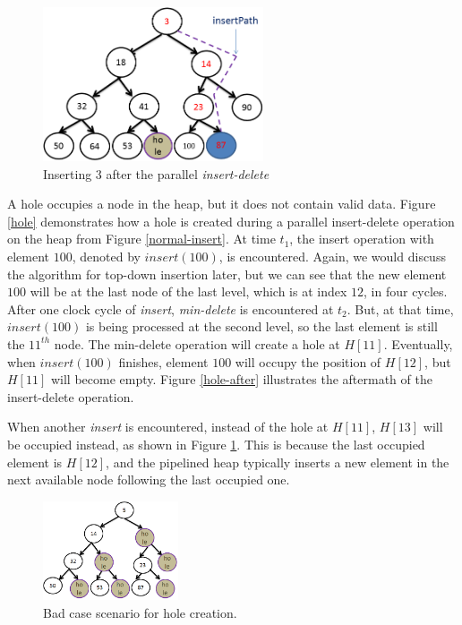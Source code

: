 \begin{figure}[!ht]
  \centering
  \includegraphics[width=6.5cm]{fig/skiphole.png}
      \caption{Inserting $3$ after the parallel {\it insert-delete}}
    \label{skiphole}
\end{figure}

A hole occupies a node in the heap, but it does not contain valid data.
Figure \ref{hole} demonstrates how a hole is created during a parallel insert-delete operation on the heap from Figure \ref{normal-insert}.
At time $t_1$, the insert operation with element $100$, denoted by $insert(100)$, is encountered.
Again, we would discuss the algorithm for top-down insertion later, but we can see that the new element $100$ will be at the last node of the last level, which is at index $12$, in four cycles.
After one clock cycle of {\it insert}, {\it min-delete} is encountered at $t_2$.
But, at that time, $insert(100)$ is being processed at the second level, so the last element is still the $11^{th}$ node.
The min-delete operation will create a hole at $H[11]$.
Eventually, when $insert(100)$ finishes, element $100$ will occupy the position of $H[12]$, but $H[11]$ will become empty.
Figure \ref{hole-after} illustrates the aftermath of the insert-delete operation.

When another {\it insert} is encountered, instead of the hole at $H[11]$, $H[13]$ will be occupied instead, as shown in Figure \ref{skiphole}. 
This is because the last occupied element is $H[12]$, and the pipelined heap typically inserts a new element in the next available node following the last occupied one.

\begin{figure}[!ht]
  \centering
  \includegraphics[width=4cm]{fig/hole.png}
      \caption{Bad case scenario for hole creation.}
    \label{badcase}
\end{figure}


